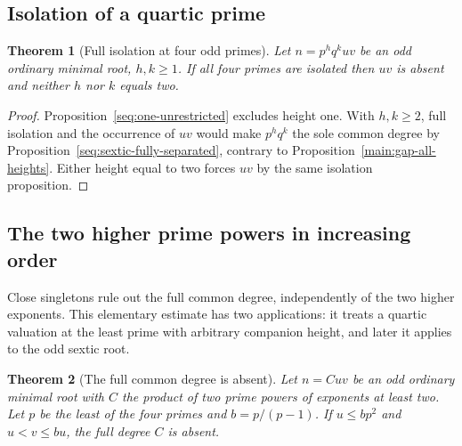 \documentclass[11pt,a4paper]{article}
\numberwithin{equation}{section}
\newtheorem{theorem}{Theorem}[section]
\theoremstyle{remark}
\begin{document}
\subsection{Isolation of a quartic prime}\label{fam:M:sec:9.3}

\begin{theorem}[Full isolation at four odd primes]\label{fam:M:9.14}\label{fourm:isoheight}\label{fourm:isoquart}
Let $n=p^h q^k uv$ be an odd ordinary minimal root, $h,k\ge1$.
If all four primes are isolated then $uv$ is absent and neither $h$
nor $k$ equals two.
\end{theorem}
\begin{proof}
Proposition~\ref{seq:one-unrestricted} excludes height one.
With $h,k\ge2$, full isolation and the occurrence of $uv$ would make
$p^h q^k$ the sole common degree by Proposition~\ref{seq:sextic-fully-separated},
contrary to Proposition~\ref{main:gap-all-heights}. Either height equal
to two forces $uv$ by the same isolation proposition.
\end{proof}

\subsection{The two higher prime powers in increasing order}\label{fam:M:sec:9.4}
Close singletons rule out the full common degree, independently of the
two higher exponents. This elementary estimate has two applications:
it treats a quartic valuation at the least prime with arbitrary companion
height, and later it applies to the odd sextic root.

\begin{theorem}[The full common degree is absent]\label{fam:M:9.15}\label{new:no-full-common}
Let $n=Cuv$ be an odd ordinary minimal root with $C$ the product of
two prime powers of exponents at least two. Let $p$ be the least of
the four primes and $b=p/(p-1)$. If $u\le bp^2$ and $u<v\le bu$, the
full degree $C$ is absent.
\end{theorem}
\end{document}
